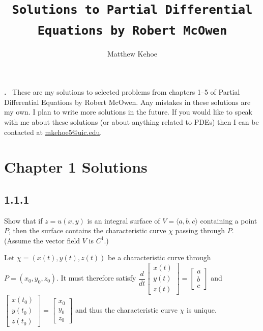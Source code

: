 \documentclass{article}
\title{\texttt{Solutions to Partial Differential Equations by Robert McOwen}}
\author{Matthew Kehoe}
\renewenvironment{abstract}
 {\par\noindent\textbf{\abstractname.}\ \ignorespaces}
 {\par\medskip}
\begin{document}
\maketitle
\begin{flushleft}
\begin{abstract}
These are my solutions to selected problems from chapters 1--5 of Partial Differential Equations by Robert McOwen. Any mistakes in these solutions are my own. I plan to write more solutions in the future. If you would like to speak with me about these solutions (or about anything related to PDEs) then I can be contacted at \href{mailto:mkehoe5@uic.edu}{mkehoe5@uic.edu}.
\end{abstract}
\tableofcontents
\maketitle

\section{Chapter 1 Solutions}
\subsection{\textbf{1.1.1}} Show that if $z=u(x,y)$ is an integral surface of $V=\langle a,b,c \rangle$ containing a point $P$, then the surface contains the characteristic curve $\chi$ passing through $P$. (Assume the vector field $V$ is $C^1$.)

Let $\chi=(x(t),y(t),z(t))$ be a characteristic curve through $P=(x_0,y_0,z_0)$. It must therefore satisfy $\dfrac{d}{dt}\begin{bmatrix}
    x(t) \\
    y(t) \\
    z(t)
  \end{bmatrix} 
  =\begin{bmatrix}
    a \\
    b \\
    c
  \end{bmatrix} $
  and $\begin{bmatrix}
    x(t_0) \\
    y(t_0) \\
    z(t_0)
  \end{bmatrix} 
  =\begin{bmatrix}
    x_0 \\
    y_0 \\
    z_0
  \end{bmatrix}$ and thus the characteristic curve $\chi$ is unique. 
  

\end{flushleft}
\end{document}
